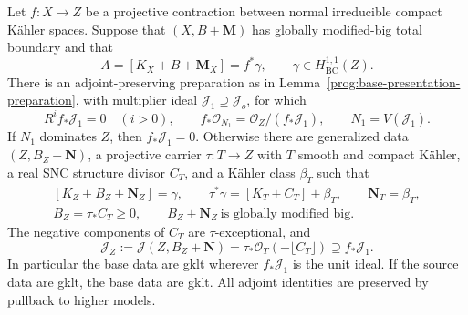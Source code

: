 \begin{proposition}
\label{prog:base-presentation}
Let $f:X\to Z$ be a projective contraction between normal irreducible
compact K\"ahler spaces. Suppose that $(X,B+\mathbf M)$ has globally
modified-big total boundary and that
\[
 A=[K_X+B+\mathbf M_X]=f^*\gamma,
 \qquad \gamma\in H^{1,1}_{\mathrm{BC}}(Z).
\]
There is an adjoint-preserving preparation as in
Lemma~\ref{prog:base-presentation-preparation}, with multiplier ideal
$\mathcal J_1\supseteq\mathcal J_o$, for which
\begin{equation}\label{prog:base-presentation-Stein}
 R^if_*\mathcal J_1=0\quad(i>0),\qquad
 f_*\mathcal O_{N_1}=\mathcal O_Z/(f_*\mathcal J_1),
 \qquad N_1=V(\mathcal J_1).
\end{equation}
If $N_1$ dominates $Z$, then $f_*\mathcal J_1=0$.
Otherwise there are generalized data $(Z,B_Z+\mathbf N)$, a
projective carrier $\tau:T\to Z$ with $T$ smooth and compact K\"ahler, a real
SNC structure divisor $C_T$, and a K\"ahler class $\beta_T$ such that
\begin{equation}\label{prog:base-presentation-identities}
 \begin{gathered}
 [K_Z+B_Z+\mathbf N_Z]=\gamma,\qquad
 \tau^*\gamma=[K_T+C_T]+\beta_T,\qquad
 \mathbf N_T=\beta_T,\\
 B_Z=\tau_*C_T\geq0,\qquad
 B_Z+\mathbf N_Z\ \text{is globally modified big}.
 \end{gathered}
\end{equation}
The negative components of $C_T$ are $\tau$-exceptional, and
\begin{equation}\label{prog:base-presentation-ideal}
 \mathcal J_Z:=\mathcal J(Z,B_Z+\mathbf N)
       =\tau_*\mathcal O_T(-\lfloor C_T\rfloor)
       \supseteq f_*\mathcal J_1.
\end{equation}
In particular the base data are gklt wherever $f_*\mathcal J_1$ is
the unit ideal. If the source data are gklt, the base data are gklt.
All adjoint identities are preserved by pullback to higher models.
\end{proposition}

